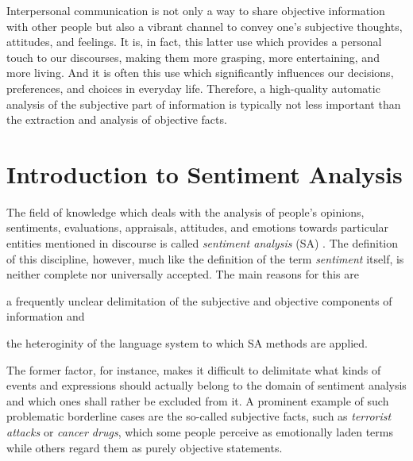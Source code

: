 

Interpersonal communication is not only a way to share objective
information with other people but also a vibrant channel to convey
one's subjective thoughts, attitudes, and feelings.  It is, in fact,
this latter use which provides a personal touch to our discourses,
making them more grasping, more entertaining, and more living.  And it
is often this use which significantly influences our decisions,
preferences, and choices in everyday life.  Therefore, a high-quality
automatic analysis of the subjective part of information is typically
not less important than the extraction and analysis of objective
facts.

\section{Introduction to Sentiment Analysis}

The field of knowledge which deals with the analysis of people's
opinions, sentiments, evaluations, appraisals, attitudes, and emotions
towards particular entities mentioned in discourse is called
\emph{sentiment analysis} (SA) \citep{Liu:12}.  The definition of this
discipline, however, much like the definition of the term
\emph{sentiment} itself, is neither complete nor universally accepted.
The main reasons for this are
\begin{inparaenum}
  \item a frequently unclear delimitation of the subjective and
    objective components of information and
  \item the heteroginity of the language system to which SA methods
    are applied.
\end{inparaenum}

The former factor, for instance, makes it difficult to delimitate what
kinds of events and expressions should actually belong to the domain
of sentiment analysis and which ones shall rather be excluded from it.
A prominent example of such problematic borderline cases are the
so-called subjective facts, such as \emph{terrorist attacks} or
\emph{cancer drugs}, which some people perceive as emotionally laden
terms while others regard them as purely objective statements.

